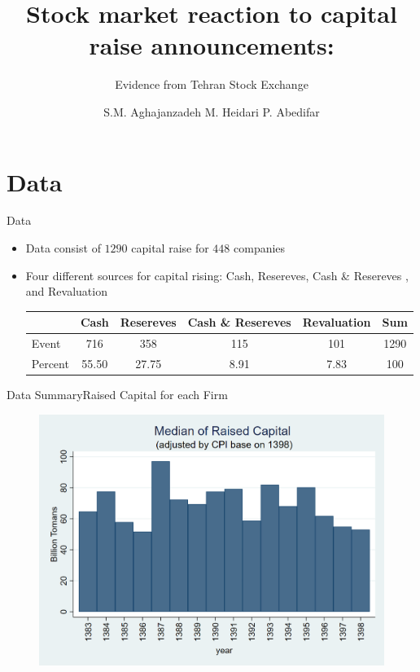 \documentclass{beamer}
\title[Capital Raise]{Stock market reaction to capital raise announcements:}
\subtitle{Evidence from Tehran Stock Exchange}
\author[Aghajanzadeh, Heidari \&Abedifar]{S.M. Aghajanzadeh \qquad M. Heidari \qquad P. Abedifar }
\institute[]{Tehran Institute for Advanced Studies }
\begin{document}
{\maketitle}

\section{Data}
\begin{frame}{Data}
\begin{itemize}
\item Data consist of $1290$ capital raise for $448$ companies 

\item Four different sources for capital rising: Cash, Resereves, Cash \& Resereves , and Revaluation \\

\begin{table}[htbp]
  \centering
\label{t1}
\resizebox{0.7\textwidth}{!}
{
    \begin{tabular}{lccccc}
    \hline
    \hline
          & \multicolumn{1}{l}{Cash} & \multicolumn{1}{c}{Resereves} & \multicolumn{1}{c}{Cash \& Resereves} & \multicolumn{1}{c}{Revaluation} &  \multicolumn{1}{c}{Sum} \\
          \hline
    Event & 716   & 358   & 115   & 101   & 1290 \\
Percent & 55.50 & 27.75 & 8.91  & 7.83  & 100 \\
    \hline\hline
    \end{tabular}
    }
  \label{tab:addlabel}
  
\end{table}%


\end{itemize}

\end{frame}






\begin{frame}{Data Summary}{Raised Capital for each Firm}
\begin{figure}
\centering
\includegraphics[width=0.7\linewidth]{Output/MedianCapRaiseAdjusted.png}
\label{fig:mediancapraise}
\end{figure}
\end{frame}
\end{document}
